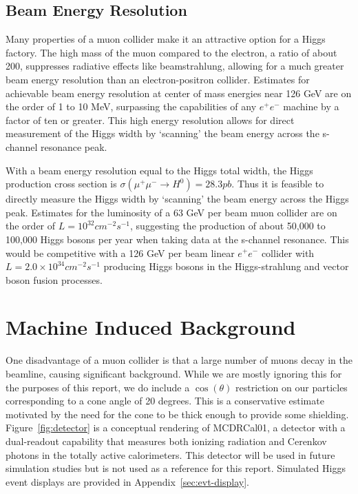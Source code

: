 \documentclass[a4paper]{article}
\begin{document}
	\subsection{Beam Energy Resolution}
Many properties of a muon collider make it an attractive option for a Higgs factory. The high mass of the muon compared to the electron, a ratio of about 200, suppresses radiative effects like beamstrahlung, allowing for a much greater beam energy resolution than an electron-positron collider. Estimates for achievable beam energy resolution at center of mass energies near 126 GeV are on the order of 1 to 10 MeV, surpassing the capabilities of any $e^+e^-$ machine by a factor of ten or greater.\cite{map-palmer} This high energy resolution allows for direct measurement of the Higgs width by `scanning' the beam energy across the s-channel resonance peak. 

	With a beam energy resolution equal to the Higgs total width, the Higgs production cross section is $\sigma (\mu^+\mu^-\rightarrow H^0) = 28.3 pb$.\cite{mc-physics-eich} Thus it is feasible to directly measure the Higgs width by `scanning' the beam energy across the Higgs peak. Estimates for the luminosity of a 63 GeV per beam muon collider are on the order of $L = 10^{32} cm^{-2}s^{-1}$, suggesting the production of about 50,000 to 100,000 Higgs bosons per year when taking data at the s-channel resonance. This would be competitive with a 126 GeV per beam linear $e^+e^-$ collider with $L = 2.0\times 10^{34} cm^{-2}s^{-1}$ producing Higgs bosons in the Higgs-strahlung and vector boson fusion processes.\cite{map-palmer}

\section{Machine Induced Background}
One disadvantage of a muon collider is that a large number of muons decay in the beamline, causing significant background. While we are mostly ignoring this for the purposes of this report, we do include a $\cos(\theta)$ restriction on our particles corresponding to a cone angle of 20 degrees. This is a conservative estimate motivated by the need for the cone to be thick enough to provide some shielding. Figure~\ref{fig:detector} is a conceptual rendering of MCDRCal01, a detector with a dual-readout capability that measures both ionizing radiation and Cerenkov photons in the totally active calorimeters. This detector will be used in future simulation studies but is not used as a reference for this report. Simulated Higgs event displays are provided in Appendix~\ref{sec:evt-display}.
\end{document}
